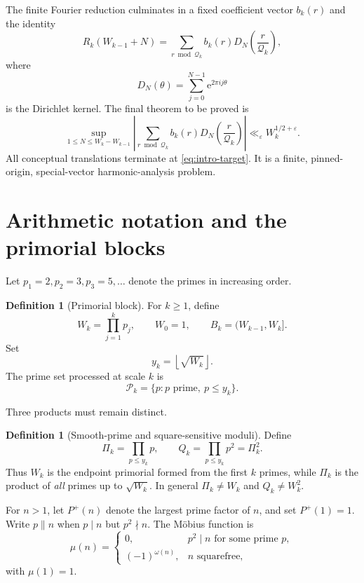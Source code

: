 \documentclass[11pt]{article}
\theoremstyle{definition}
\newtheorem{definition}[theorem]{Definition}
\newcommand{\e}{\mathrm e}
\begin{document}
The finite Fourier reduction culminates in a fixed coefficient vector $b_k(r)$ and the identity
\begin{equation}\label{eq:intro-fourier}
R_k(W_{k-1}+N)
=
\sum_{r\bmod \mathcal Q_k}
 b_k(r)
 D_N\!\left(\frac r{\mathcal Q_k}\right),
\end{equation}
where
\[
D_N(\theta)=\sum_{j=0}^{N-1}\e^{2\pi i j\theta}
\]
is the Dirichlet kernel.  The final theorem to be proved is
\begin{equation}\label{eq:intro-target}
\sup_{1\le N\le W_k-W_{k-1}}
\left|
\sum_{r\bmod \mathcal Q_k}
 b_k(r)D_N\!\left(\frac r{\mathcal Q_k}\right)
\right|
\ll_{\varepsilon} W_k^{1/2+\varepsilon}.
\end{equation}
All conceptual translations terminate at \eqref{eq:intro-target}.  It is a finite, pinned-origin, special-vector harmonic-analysis problem.
\newpage

\section{Arithmetic notation and the primorial blocks}

Let $p_1=2,p_2=3,p_3=5,\ldots$ denote the primes in increasing order.

\begin{definition}[Primorial block]\label{def:primorial}
For $k\ge1$, define
\[
W_k=\prod_{j=1}^{k}p_j,
\qquad W_0=1,
\qquad B_k=(W_{k-1},W_k].
\]
Set
\[
y_k=\left\lfloor\sqrt{W_k}\right\rfloor.
\]
The prime set processed at scale $k$ is
\[
\mathcal P_k=\{p:p\text{ prime},\ p\le y_k\}.
\]
\end{definition}

Three products must remain distinct.
\begin{definition}[Smooth-prime and square-sensitive moduli]\label{def:moduli}
Define
\[
\Pi_k=\prod_{p\le y_k}p,
\qquad
Q_k=\prod_{p\le y_k}p^2=\Pi_k^2.
\]
Thus $W_k$ is the endpoint primorial formed from the first $k$ primes, while $\Pi_k$ is the product of \emph{all} primes up to $\sqrt{W_k}$.  In general $\Pi_k\ne W_k$ and $Q_k\ne W_k^2$.
\end{definition}

For $n>1$, let $P^+(n)$ denote the largest prime factor of $n$, and set $P^+(1)=1$.  Write $p\parallel n$ when $p\mid n$ but $p^2\nmid n$.  The M\"obius function is
\[
\mu(n)=
\begin{cases}
0,&p^2\mid n\text{ for some prime }p,\\
(-1)^{\omega(n)},&n\text{ squarefree},
\end{cases}
\]
with $\mu(1)=1$.
\end{document}
